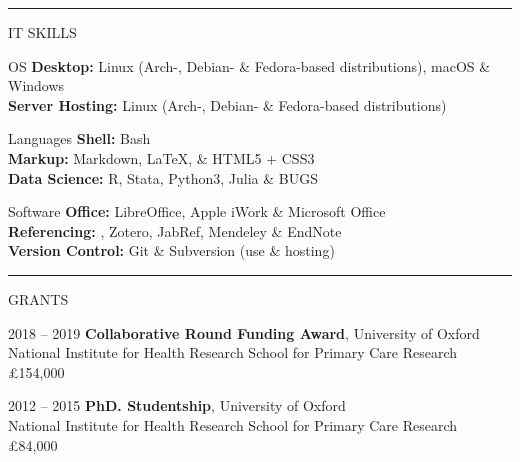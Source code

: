 \documentclass[10pt,a4paper]{article}
\begin{document}
\noindent\rule{\textwidth}{0.4pt}
\begin{cvlist}{IT SKILLS}
	
	\item[OS]
	\textbf{Desktop:} Linux (Arch-, Debian- \& Fedora-based distributions), macOS \& Windows \\
	\textbf{Server Hosting:} Linux (Arch-, Debian- \& Fedora-based distributions)
	
	\item[Languages]
	\textbf{Shell:} Bash \\
	\textbf{Markup:} Markdown, \LaTeX , \& HTML5 + CSS3 \\
	\textbf{Data Science:} R, Stata, Python3, Julia \& BUGS
	
	\item[Software]
	\textbf{Office:} LibreOffice, Apple iWork \& Microsoft Office \\
	\textbf{Referencing:} , Zotero, JabRef, Mendeley \& EndNote \\
	\textbf{Version Control:} Git \& Subversion (use \& hosting)
	
\end{cvlist}


\noindent\rule{\textwidth}{0.4pt}
\begin{cvlist}{GRANTS}
	
	\item[2018 -- 2019]
	\textbf{Collaborative Round Funding Award}, University of Oxford \\
	National Institute for Health Research School for Primary Care Research \\
	\pounds 154,000
	
	\item[2012 -- 2015]
	\textbf{PhD. Studentship}, University of Oxford \\
	National Institute for Health Research School for Primary Care Research \\
	\pounds 84,000
	
\end{cvlist}
\end{document}
